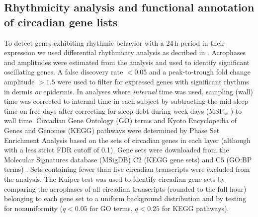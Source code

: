 \subsection*{Rhythmicity analysis and functional annotation of circadian gene lists}
To detect genes exhibiting rhythmic behavior with a 24\,h period in their expression we used differential rhythmicity analysis as decribed in \cite{Pelikan2021}. Acrophases and amplitudes were estimated from the analysis and used to identify significant oscillating genes. A false discovery rate $<0.05$ and a peak-to-trough fold change amplitude $>1.5$ were used to filter for expressed genes with significant rhythms in dermis \textit{or} epidermis. In analyses where \textit{internal} time was used, sampling (wall) time was corrected to internal time in each subject by subtracting the mid-sleep time on free days after correcting for sleep debt during week days ($\textrm{MSF}_\textrm{sc}$ \cite{Vetter2021}) to wall time. %
Circadian Gene Ontology (GO) terms and Kyoto Encyclopedia of Genes and Genomes (KEGG) pathways were determined by Phase Set Enrichment Analysis \cite{Zhang2016} based on the sets of circadian genes in each layer (although with a less strict FDR cutoff of 0.1). Gene sets were downloaded from the Molecular Signatures database (MSigDB) C2 (KEGG gene sets) and C5 (GO:BP terms) \cite{Subramanian2005}. Sets containing fewer than five circadian transcripts were excluded from the analysis. The Kuiper test was used to identify circadian gene sets by comparing the acrophases of all circadian transcripts (rounded to the full hour) belonging to each gene set to a uniform background distribution and by testing for nonuniformity ($q<0.05$ for GO terms, $q<0.25$ for KEGG pathways).

